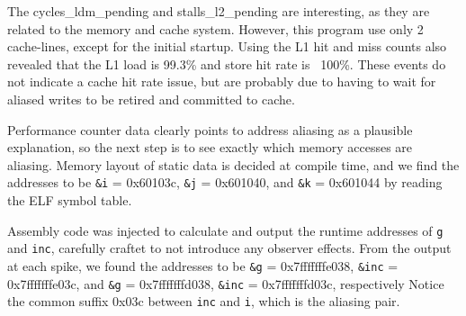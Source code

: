 \documentclass[10pt, conference, compsocconf]{IEEEtran}
\begin{document}
The cycles\_ldm\_pending and stalls\_l2\_pending are interesting, as they are related to the memory and cache system.
However, this program use only 2 cache-lines, except for the initial startup.
Using the L1 hit and miss counts also revealed that the L1 load is 99.3\% and store hit rate is ~100\%.
These events do not indicate a cache hit rate issue, but are probably due to having to wait for aliased writes to be retired and committed to cache.

Performance counter data clearly points to address aliasing as a plausible explanation, so the next step is to see exactly which memory accesses are aliasing.
Memory layout of static data is decided at compile time, and we find the addresses to be \texttt{\&i} = 0x60103c, \texttt{\&j} = 0x601040, and \texttt{\&k} = 0x601044 by reading the ELF symbol table.%

Assembly code was injected to calculate and output the runtime addresses of \texttt{g} and \texttt{inc}, carefully craftet to not introduce any observer effects.
From the output at each spike, we found the addresses to be \texttt{\&g} = 0x7fffffffe038, \texttt{\&inc} = 0x7fffffffe03c, and \texttt{\&g} = 0x7fffffffd038, \texttt{\&inc} = 0x7fffffffd03c, respectively
Notice the common suffix 0x03c between \texttt{inc} and \texttt{i}, which is the aliasing pair.


% 
 
\end{document}
